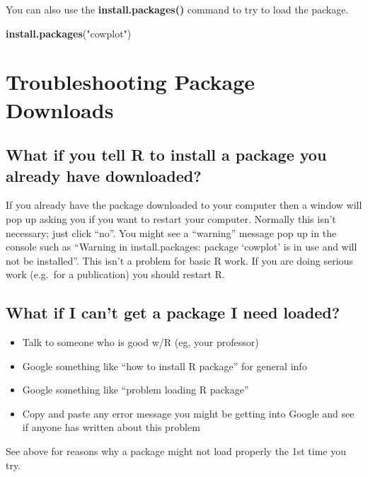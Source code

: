 \documentclass[]{book}
\newenvironment{Shaded}{\begin{snugshade}}{\end{snugshade}}
\newcommand{\KeywordTok}[1]{\textcolor[rgb]{0.13,0.29,0.53}{\textbf{#1}}}
\newcommand{\StringTok}[1]{\textcolor[rgb]{0.31,0.60,0.02}{#1}}
\newcommand{\NormalTok}[1]{#1}
\providecommand{\tightlist}{%
  \setlength{\itemsep}{0pt}\setlength{\parskip}{0pt}}
\theoremstyle{definition}
\theoremstyle{definition}
\theoremstyle{definition}
\theoremstyle{remark}
\begin{document}
You can also use the \textbf{install.packages()} command to try to load
the package.

\begin{Shaded}
\begin{Highlighting}[]
\KeywordTok{install.packages}\NormalTok{(}\StringTok{"cowplot"}\NormalTok{)}
\end{Highlighting}
\end{Shaded}

\section{Troubleshooting Package
Downloads}\label{troubleshooting-package-downloads}

\subsection{What if you tell R to install a package you already have
downloaded?}\label{what-if-you-tell-r-to-install-a-package-you-already-have-downloaded}

If you already have the package downloaded to your computer then a
window will pop up asking you if you want to restart your computer.
Normally this isn't necessary; just click ``no''. You might see a
``warning'' message pop up in the console such as ``Warning in
install.packages: package `cowplot' is in use and will not be
installed''. This isn't a problem for basic R work. If you are doing
serious work (e.g.~for a publication) you should restart R.

\subsection{What if I can't get a package I need
loaded?}\label{what-if-i-cant-get-a-package-i-need-loaded}

\begin{itemize}
\tightlist
\item
  Talk to someone who is good w/R (eg, your professor)
\item
  Google something like ``how to install R package'' for general info
\item
  Google something like ``problem loading R package''
\item
  Copy and paste any error message you might be getting into Google and
  see if anyone has written about this problem
\end{itemize}

See above for reasons why a package might not load properly the 1st time
you try.
\end{document}
